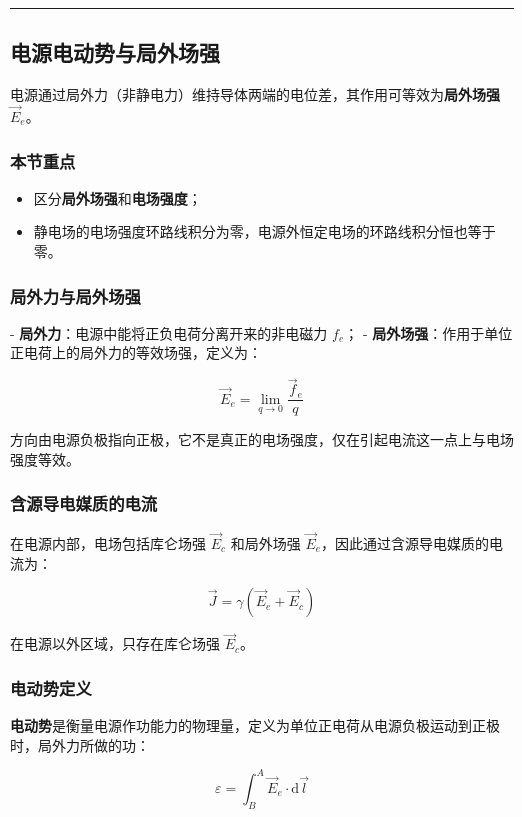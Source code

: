 \vspace{0.8cm}\hrule\vspace{0.8cm}

\subsection{电源电动势与局外场强}
电源通过局外力（非静电力）维持导体两端的电位差，其作用可等效为\textbf{局外场强} $\vec{E}_e$。

\subsubsection{本节重点}
\begin{itemize}
    \item 区分\textbf{局外场强}和\textbf{电场强度}；
    \item 静电场的电场强度环路线积分为零，电源外恒定电场的环路线积分恒也等于零。
\end{itemize}

\subsubsection{局外力与局外场强}
- \textbf{局外力}：电源中能将正负电荷分离开来的非电磁力 $f_e$；
- \textbf{局外场强}：作用于单位正电荷上的局外力的等效场强，定义为：
\begin{formulaBox}
\[
\vec{E}_e = \lim_{q \to 0} \frac{\vec{f}_e}{q}
\]
\end{formulaBox}
方向由电源负极指向正极，它不是真正的电场强度，仅在引起电流这一点上与电场强度等效。

\subsubsection{含源导电媒质的电流}
在电源内部，电场包括库仑场强 $\vec{E}_c$ 和局外场强 $\vec{E}_e$，因此通过含源导电媒质的电流为：
\begin{formulaBox}
\[
\vec{J} = \gamma (\vec{E}_e + \vec{E}_c)
\]
\end{formulaBox}
在电源以外区域，只存在库仑场强 $\vec{E}_c$。

\subsubsection{电动势定义}
\textbf{电动势}是衡量电源作功能力的物理量，定义为单位正电荷从电源负极运动到正极时，局外力所做的功：
\begin{formulaBox}
\[
\varepsilon = \int_{B}^{A} \vec{E}_e \cdot \mathrm{d}\vec{l}
\]
\end{formulaBox}


